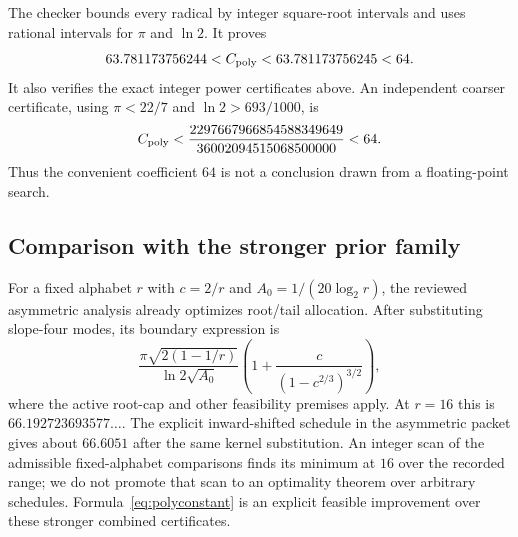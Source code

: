 The checker bounds every radical by integer square-root intervals and uses
rational intervals for $\pi$ and $\ln2$. It proves
\[
 63.781173756244<C_{\mathrm{poly}}<63.781173756245<64.
\]
It also verifies the exact integer power certificates above. An independent
coarser certificate, using $\pi<22/7$ and $\ln2>693/1000$, is
\[
 C_{\mathrm{poly}}<\frac{2297667966854588349649}{36002094515068500000}<64.
\]
Thus the convenient coefficient $64$ is not a conclusion drawn from a
floating-point search.

\subsection{Comparison with the stronger prior family}
For a fixed alphabet $r$ with $c=2/r$ and
$A_0=1/(20\log_2r)$, the reviewed asymmetric analysis already optimizes
root/tail allocation. After substituting slope-four modes, its boundary
expression is
\begin{equation}\label{eq:old-fixed}
 \frac{\pi\sqrt{2(1-1/r)}}{\ln2\sqrt{A_0}}
 \left(1+\frac{c}{(1-c^{2/3})^{3/2}}\right),
\end{equation}
where the active root-cap and other feasibility premises apply. At $r=16$
this is $66.192723693577\ldots$. The explicit inward-shifted schedule in the
asymmetric packet gives about $66.6051$ after the same kernel substitution.
An integer scan of the admissible fixed-alphabet comparisons finds its minimum
at $16$ over the recorded range; we do not promote that scan to an optimality
theorem over arbitrary schedules. Formula~\eqref{eq:polyconstant} is an
explicit feasible improvement over these stronger combined certificates.
